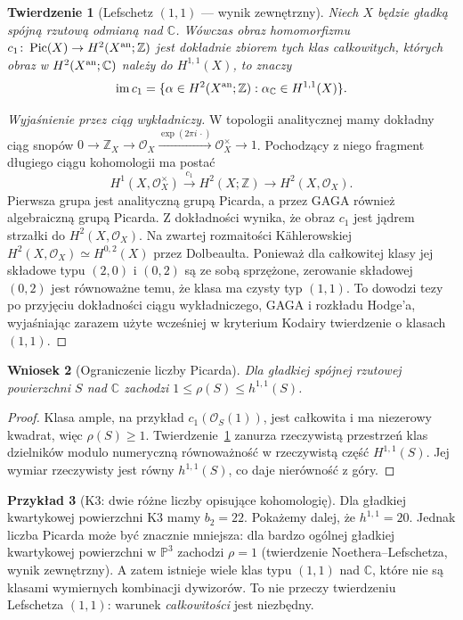\documentclass[11pt,a4paper,openany]{report}
\numberwithin{equation}{section}
\theoremstyle{plain}
\newtheorem{twierdzenie}{Twierdzenie}[section]
\newtheorem{wniosek}[twierdzenie]{Wniosek}
\theoremstyle{definition}
\newtheorem{przyklad}[twierdzenie]{Przykład}
\theoremstyle{remark}
\newcommand{\Z}{\mathbb Z}
\newcommand{\C}{\mathbb C}
\newcommand{\PP}{\mathbb P}
\begin{document}
\begin{twierdzenie}[Lefschetz $(1,1)$ — wynik zewnętrzny]
\label{tw:ga10-11}
Niech $X$ będzie gładką spójną rzutową odmianą nad $\C$.
Wówczas obraz homomorfizmu
$c_1\colon\operatorname{Pic}(X)\to H^2(X^{\rm an};\Z)$
jest dokładnie zbiorem tych klas całkowitych,
których obraz w $H^2(X^{\rm an};\C)$ należy do
$H^{1,1}(X)$, to znaczy
\[
 \operatorname{im}c_1
 =\{\alpha\in H^2(X^{\rm an};\Z):
 \alpha_{\C}\in H^{1,1}(X)\}.
\]
\end{twierdzenie}

\begin{proof}[Wyjaśnienie przez ciąg wykładniczy]
W topologii analitycznej mamy dokładny ciąg snopów
$0\to\Z_X\to\mathcal O_X\xrightarrow{\exp(2\pi i\,\cdot)}
\mathcal O_X^{\times}\to1$.
Pochodzący z niego fragment długiego ciągu kohomologii
ma postać
\[
 H^1(X,\mathcal O_X^{\times})\xrightarrow{c_1}
 H^2(X;\Z)\longrightarrow H^2(X,\mathcal O_X).
\]
Pierwsza grupa jest analityczną grupą Picarda,
a przez GAGA również algebraiczną grupą Picarda.
Z dokładności wynika, że obraz $c_1$ jest jądrem
strzałki do $H^2(X,\mathcal O_X)$.
Na zwartej rozmaitości Kählerowskiej
$H^2(X,\mathcal O_X)\simeq H^{0,2}(X)$ przez Dolbeaulta.
Ponieważ dla całkowitej klasy jej składowe typu $(2,0)$
i $(0,2)$ są ze sobą sprzężone, zerowanie składowej
$(0,2)$ jest równoważne temu, że klasa ma czysty typ $(1,1)$.
To dowodzi tezy po przyjęciu dokładności ciągu wykładniczego,
GAGA i rozkładu Hodge'a, wyjaśniając zarazem użyte wcześniej
w kryterium Kodairy twierdzenie o klasach $(1,1)$.
\end{proof}

\begin{wniosek}[Ograniczenie liczby Picarda]
\label{wn:ga10-rho}
Dla gładkiej spójnej rzutowej powierzchni $S$ nad $\C$
zachodzi $1\le\rho(S)\le h^{1,1}(S)$.
\end{wniosek}
\begin{proof}
Klasa ample, na przykład $c_1(\mathcal O_S(1))$,
jest całkowita i ma niezerowy kwadrat, więc
$\rho(S)\ge1$.
Twierdzenie~\ref{tw:ga10-11} zanurza rzeczywistą
przestrzeń klas dzielników modulo numeryczną równoważność
w rzeczywistą część $H^{1,1}(S)$.
Jej wymiar rzeczywisty jest równy $h^{1,1}(S)$,
co daje nierówność z góry.
\end{proof}

\begin{przyklad}[K3: dwie różne liczby opisujące kohomologię]
Dla gładkiej kwartykowej powierzchni K3 mamy
$b_2=22$. Pokażemy dalej, że $h^{1,1}=20$.
Jednak liczba Picarda może być znacznie mniejsza:
dla bardzo ogólnej gładkiej kwartykowej powierzchni
w $\PP^3$ zachodzi $\rho=1$ (twierdzenie
Noethera--Lefschetza, wynik zewnętrzny).
A zatem istnieje wiele klas typu $(1,1)$ nad $\C$,
które nie są klasami wymiernych kombinacji dywizorów.
To nie przeczy twierdzeniu Lefschetza $(1,1)$:
warunek \emph{całkowitości} jest niezbędny.
\end{przyklad}
\end{document}
